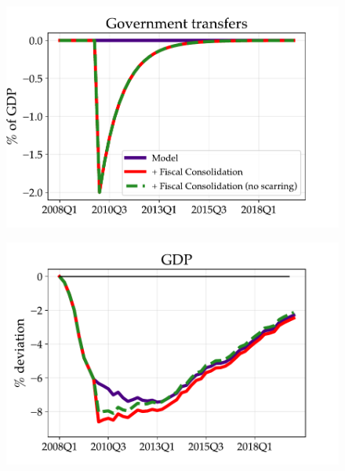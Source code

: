 \begin{figure}[t!] %
\centering
\begin{minipage}{0.51\textwidth}
\includegraphics[scale=.57]{text/chapter1/Figures/Fiscal_Consolidation_CounterFactual/transfer_shocks_fiscal_consolidation}
 \label{fig:a}
\end{minipage}\hspace*{\fill}
\begin{minipage}{0.51\textwidth}
\includegraphics[scale=.57]{text/chapter1/Figures/Fiscal_Consolidation_CounterFactual/GDP_CounterFactual_Fiscal_Consolidation}
 \label{fig:b}
\end{minipage}


\end{figure}
